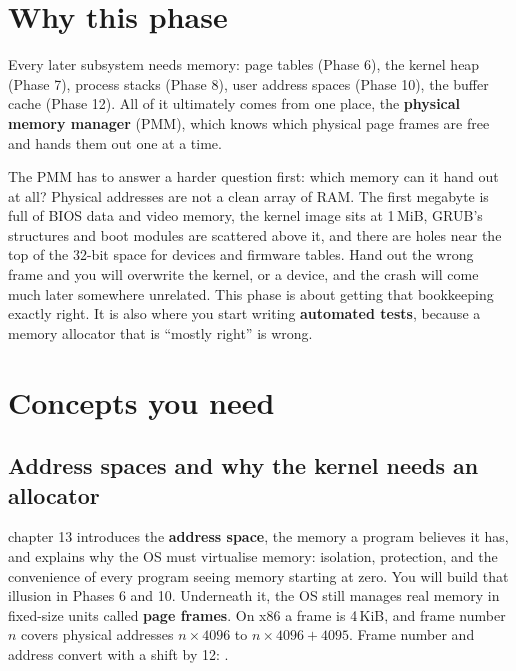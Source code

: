 \documentclass[11pt,a4paper]{article}
\begin{document}


\section{Why this phase}

Every later subsystem needs memory: page tables (Phase 6), the kernel heap (Phase 7), process stacks (Phase 8), user
address spaces (Phase 10), the buffer cache (Phase 12). All of it ultimately comes from one place, the
\textbf{physical memory manager} (PMM), which knows which physical page frames are free and hands them out one at a
time.

The PMM has to answer a harder question first: which memory can it hand out at all? Physical addresses are not a
clean array of RAM. The first megabyte is full of BIOS data and video memory, the kernel image sits at 1\,MiB,
GRUB's structures and boot modules are scattered above it, and there are holes near the top of the 32-bit space for
devices and firmware tables. Hand out the wrong frame and you will overwrite the kernel, or a device, and the crash
will come much later somewhere unrelated. This phase is about getting that bookkeeping exactly right. It is also
where you start writing \textbf{automated tests}, because a memory allocator that is ``mostly right'' is wrong.

\section{Concepts you need}

\subsection{Address spaces and why the kernel needs an allocator}

\OSTEP chapter 13 introduces the \textbf{address space}, the memory a program believes it has, and explains why the
OS must virtualise memory: isolation, protection, and the convenience of every program seeing memory starting at
zero. You will build that illusion in Phases 6 and 10. Underneath it, the OS still manages real memory in fixed-size
units called \textbf{page frames}. On x86 a frame is 4\,KiB, and frame number $n$ covers physical addresses
$n \times 4096$ to $n \times 4096 + 4095$. Frame number and address convert with a shift by 12: .
\end{document}
